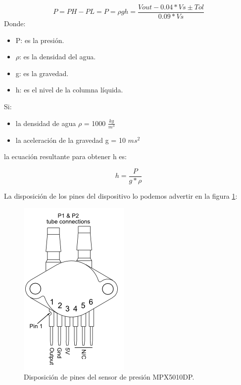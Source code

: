 \begin{equation}
 \label{eq:presiónII}
	 P =PH -PL= P = \rho gh =\frac{Vout- 0.04*Vs \pm Tol}{0.09*Vs}	
\end{equation}
 Donde:
 \begin{itemize}
 \item P: es la presión.
 \item $\rho$: es la densidad del agua.
 \item g: es la gravedad.
 \item h: es el nivel de la columna líquida.
 \end{itemize}
 

Si: 
\begin{itemize}
\item la densidad de agua $\rho$ = 1000 $\frac{kg}{m^3}$  
\item la aceleración de la gravedad g = 10 $ms^2$
\end{itemize}
la ecuación resultante para obtener h es: 

\begin{equation}
 \label{eq:presión}
	 h = \frac{P}{g*\rho}	
\end{equation}

\vspace{2cm}
La disposición de los pines del dispositivo lo podemos advertir en la figura \ref{fig:disposición de pines del sensor}:
\begin{figure}[h]
\centering
\includegraphics[scale=.65]{./Figures/DisposicionDePinesSensor.png}
\caption{Disposición de pines del sensor de presión MPX5010DP\protect\footnotemark.}
\label{fig:disposición de pines del sensor}
\end{figure}
